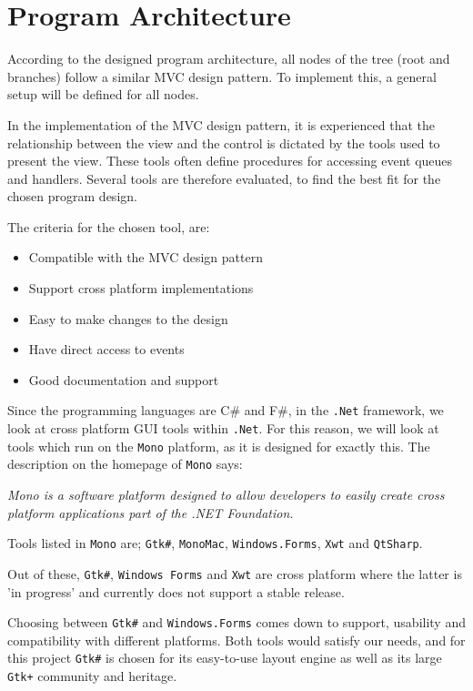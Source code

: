 \section{Program Architecture} \label{sec:Implementation-ProgramArchitecture}

According to the designed program architecture, all nodes of the tree (root and branches) follow a similar MVC design pattern. To implement this, a general setup will be defined for all nodes.

In the implementation of the MVC design pattern, it is experienced that the relationship between the view and the control is dictated by the tools used to present the view. These tools often define procedures for accessing event queues and handlers. Several tools are therefore evaluated, to find the best fit for the chosen program design.

The criteria for the chosen tool, are:
\begin{itemize}
\item Compatible with the MVC design pattern
\item Support cross platform implementations
\item Easy to make changes to the design
\item Have direct access to events
\item Good documentation and support
\end{itemize}

Since the programming languages are C\# and F\#, in the \texttt{.Net} framework, we look at cross platform GUI tools within \texttt{.Net}. For this reason, we will look at tools which run on the \texttt{Mono} platform, as it is designed for exactly this. The description on the homepage of \texttt{Mono} says:

\begin{center}
\textit{Mono is a software platform designed to allow developers to easily create cross platform applications part of the .NET Foundation.} \cite{Mono}
\end{center}

Tools listed in \texttt{Mono} are; \texttt{Gtk\#}, \texttt{MonoMac}, \texttt{Windows.Forms}, \texttt{Xwt} and \texttt{QtSharp}. \cite{Mono-GUI}

Out of these, \texttt{Gtk\#}, \texttt{Windows Forms} and \texttt{Xwt} are cross platform where the latter is 'in progress' and currently does not support a stable release.

Choosing between \texttt{Gtk\#} and \texttt{Windows.Forms} comes down to support, usability and compatibility with different platforms. Both tools would satisfy our needs, and for this project \texttt{Gtk\#} is chosen for its easy-to-use layout engine as well as its large \texttt{Gtk+} community and heritage. 

